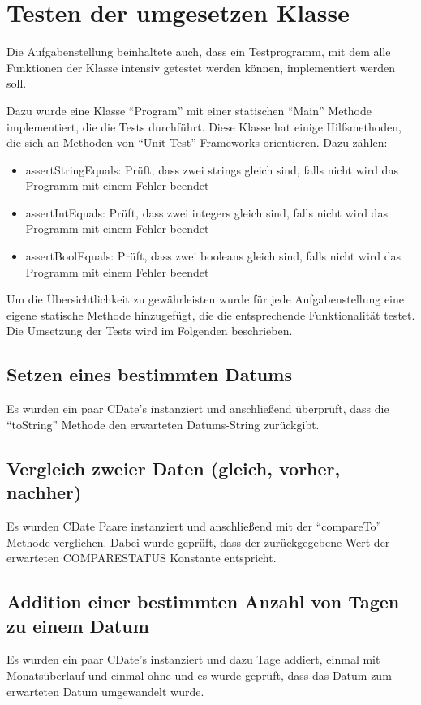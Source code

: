 \documentclass[12pt,pdftex,parskip=half]{scrartcl}
\begin{document}
        \clearpage


\section{Testen der umgesetzen Klasse}

Die Aufgabenstellung beinhaltete auch, dass ein Testprogramm, mit dem alle Funktionen der Klasse intensiv getestet werden können, implementiert werden soll.

Dazu wurde eine Klasse "`Program"' mit einer statischen "`Main"' Methode implementiert, die die Tests durchführt. Diese Klasse hat einige Hilfsmethoden, die sich an Methoden von "`Unit Test"' Frameworks orientieren. Dazu zählen:

  \begin{itemize}
    \item assertStringEquals: Prüft, dass zwei strings gleich sind, falls nicht wird das Programm mit einem Fehler beendet
    \item assertIntEquals: Prüft, dass zwei integers gleich sind, falls nicht wird das Programm mit einem Fehler beendet
    \item assertBoolEquals: Prüft, dass zwei booleans gleich sind, falls nicht wird das Programm mit einem Fehler beendet
  \end{itemize}

Um die Übersichtlichkeit zu gewährleisten wurde für jede Aufgabenstellung eine eigene statische Methode hinzugefügt, die die entsprechende Funktionalität testet.
Die Umsetzung der Tests wird im Folgenden beschrieben.


  \subsection{Setzen eines bestimmten Datums}
  Es wurden ein paar CDate's instanziert und anschließend überprüft, dass die "`toString"' Methode den erwarteten Datums-String zurückgibt.

  \subsection{Vergleich zweier Daten (gleich, vorher, nachher)}
  Es wurden CDate Paare instanziert und anschließend mit der "`compareTo"' Methode verglichen. Dabei wurde geprüft, dass der zurückgegebene Wert der erwarteten COMPARESTATUS Konstante entspricht.

  \subsection{Addition einer bestimmten Anzahl von Tagen zu einem Datum}
  Es wurden ein paar CDate's instanziert und dazu Tage addiert, einmal mit Monatsüberlauf und einmal ohne und es wurde geprüft, dass das Datum zum erwarteten Datum umgewandelt wurde.
\end{document}
